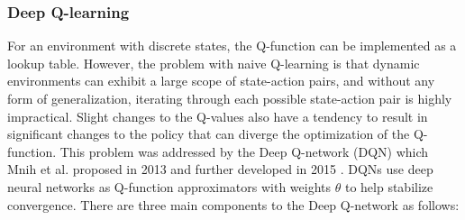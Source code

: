 \documentclass[10pt,journal,compsoc]{IEEEtran}
\begin{document}
\subsubsection{Deep Q-learning}
For an environment with discrete states, the Q-function can be implemented as a lookup table. However, the problem with naive Q-learning is that dynamic environments can exhibit a large scope of state-action pairs, and without any form of generalization, iterating through each possible state-action pair is highly impractical. Slight changes to the Q-values also have a tendency to result in significant changes to the policy that can diverge the optimization of the Q-function. This problem was addressed by the Deep Q-network (DQN) which Mnih et al. proposed in 2013 \cite{deepqlearning} and further developed in 2015 \cite{mnih2015human}. DQNs use deep neural networks as Q-function approximators with weights \(\theta\) to help stabilize convergence.
There are three main components to the Deep Q-network as follows:
\end{document}
